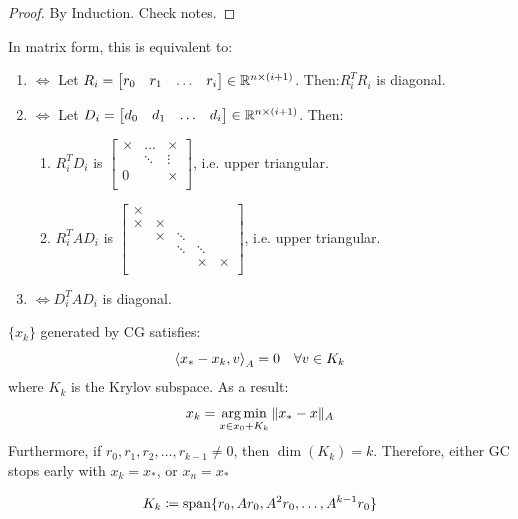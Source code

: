 \documentclass[../main/main.tex]{subfiles}
\begin{document}
    \begin{proof}
By Induction. Check notes.
    \end{proof}
    In matrix form, this is equivalent to:
    \begin{enumerate}
\item $\iff $ Let $R_{i}= \begin{bmatrix}
r_{0}&r_{1}& \ldots &r_{i}
\end{bmatrix}\in \mathbb{R} ^{n \times (i+1)}$. Then:$R_{i}^{T}R_{i}$ is diagonal.
\item $\iff $ Let $D_{i}= \begin{bmatrix}
d_{0}&d_{1}& \ldots &d_{i}
\end{bmatrix}\in \mathbb{R} ^{n \times (i+1)}$. Then:
\begin{enumerate}
  \item $R_{i}^{T}D_{i}$ is  $\begin{bmatrix}
\times   &\ldots &\times \\
 & \ddots&\vdots\\
 0& &\times \\
  \end{bmatrix}$, i.e. upper triangular.

  \item $R_{i}^{T}AD_{i}$ is  $\begin{bmatrix}
    \times  &&&& \\
    \times  &\times &&& \\
      &\times  &\ddots&& \\
      &&\ddots &\ddots& \\
      &&&\times &\times \\
  \end{bmatrix}$, i.e. upper triangular.
\end{enumerate}
\item $\iff D_{i}^{T}A D_{i}$ is diagonal.
    \end{enumerate}
\begin{theorem}\label{3-11-k}
  $\{x_{k}\}$ generated by CG satisfies: \[
\left\langle{x_{*}-x_{k}},{v}\right\rangle_{A}=0 \quad \forall v\in K_{k}
\] where $K_{k}$ is the Krylov subspace. As a result: \[
x_{k} = \operatorname*{arg\,min}_{x\in x_{0}+K_{k}}  \|x_{*}-x\|_{A}\]
Furthermore, if $r_{0},r_{1},r_{2}, \ldots ,r_{k-1}\neq 0$, then $\operatorname{dim}(K_{k})=k$. Therefore, either GC stops early with $x_{k}=x_{*}$, or $x_{n} = x_{*}$
\end{theorem}
\begin{definition}
  \[
    K_{k}\coloneqq \operatorname{span} \{r_{0}, Ar_{0}, A^2r_{0}, \ldots ,A^{k-1}r_{0}\}
  \]
\end{definition}
\end{document}
